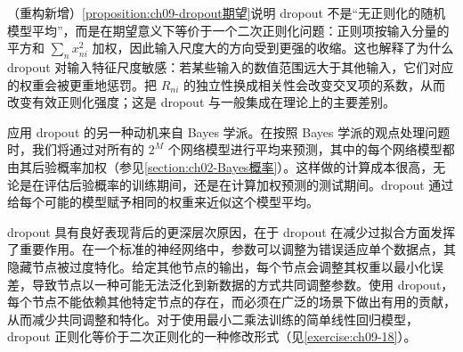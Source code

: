 \documentclass[../../main.tex]{subfiles}
\begin{document}
\begin{remark}（重构新增）\cref{proposition:ch09-dropout期望}说明 dropout 不是“无正则化的随机模型平均”，而是在期望意义下等价于一个二次正则化问题：正则项按输入分量的平方和 $\sum_n x_{ni}^{2}$ 加权，因此输入尺度大的方向受到更强的收缩。这也解释了为什么 dropout 对输入特征尺度敏感：若某些输入的数值范围远大于其他输入，它们对应的权重会被更重地惩罚。把 $R_{ni}$ 的独立性换成相关性会改变交叉项的系数，从而改变有效正则化强度；这是 dropout 与一般集成在理论上的主要差别。
\end{remark}

应用 dropout 的另一种动机来自 Bayes 学派。在按照 Bayes 学派的观点处理问题时，我们将通过对所有的 $2^{M}$ 个网络模型进行平均来预测，其中的每个网络模型都由其后验概率加权（参见\cref{section:ch02-Bayes概率}）。这样做的计算成本很高，无论是在评估后验概率的训练期间，还是在计算加权预测的测试期间。dropout 通过给每个可能的模型赋予相同的权重来近似这个模型平均。

dropout 具有良好表现背后的更深层次原因，在于 dropout 在减少过拟合方面发挥了重要作用。在一个标准的神经网络中，参数可以调整为错误适应单个数据点，其隐藏节点被过度特化。给定其他节点的输出，每个节点会调整其权重以最小化误差，导致节点以一种可能无法泛化到新数据的方式共同调整参数。使用 dropout，每个节点不能依赖其他特定节点的存在，而必须在广泛的场景下做出有用的贡献，从而减少共同调整和特化。对于使用最小二乘法训练的简单线性回归模型，dropout 正则化等价于二次正则化的一种修改形式（见\cref{exercise:ch09-18}）。
\end{document}
